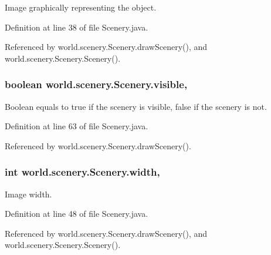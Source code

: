 Image graphically representing the object. 



Definition at line 38 of file Scenery.\-java.



Referenced by world.\-scenery.\-Scenery.\-draw\-Scenery(), and world.\-scenery.\-Scenery.\-Scenery().

\hypertarget{classworld_1_1scenery_1_1_scenery_a7b22a78d3126c947b7010fdbbea02218}{
\subsubsection[{visible}]{\setlength{\rightskip}{0pt plus 5cm}boolean world.\-scenery.\-Scenery.\-visible\hspace{0.3cm}{\ttfamily [protected]}, {\ttfamily [inherited]}}}\label{classworld_1_1scenery_1_1_scenery_a7b22a78d3126c947b7010fdbbea02218}


Boolean equals to true if the scenery is visible, false if the scenery is not. 



Definition at line 63 of file Scenery.\-java.



Referenced by world.\-scenery.\-Scenery.\-draw\-Scenery().

\hypertarget{classworld_1_1scenery_1_1_scenery_ad10b27080954e2fc06aa1718f47c4ce1}{
\subsubsection[{width}]{\setlength{\rightskip}{0pt plus 5cm}int world.\-scenery.\-Scenery.\-width\hspace{0.3cm}{\ttfamily [protected]}, {\ttfamily [inherited]}}}\label{classworld_1_1scenery_1_1_scenery_ad10b27080954e2fc06aa1718f47c4ce1}


Image width. 



Definition at line 48 of file Scenery.\-java.



Referenced by world.\-scenery.\-Scenery.\-draw\-Scenery(), and world.\-scenery.\-Scenery.\-Scenery().

